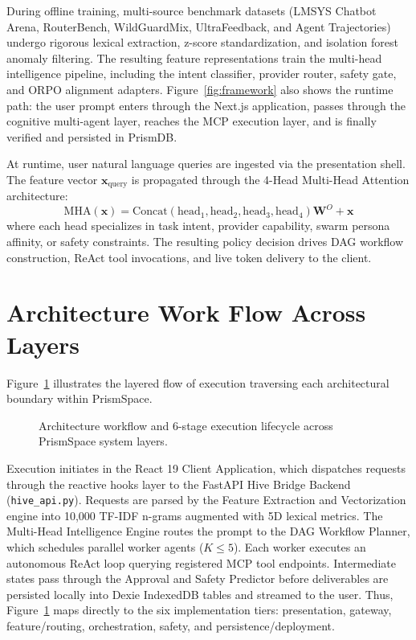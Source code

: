 \documentclass[12pt,a4paper]{report}
\begin{document}
During offline training, multi-source benchmark datasets (LMSYS Chatbot Arena, RouterBench, WildGuardMix, UltraFeedback, and Agent Trajectories) undergo rigorous lexical extraction, z-score standardization, and isolation forest anomaly filtering. The resulting feature representations train the multi-head intelligence pipeline, including the intent classifier, provider router, safety gate, and ORPO alignment adapters. Figure~\ref{fig:framework} also shows the runtime path: the user prompt enters through the Next.js application, passes through the cognitive multi-agent layer, reaches the MCP execution layer, and is finally verified and persisted in PrismDB.

At runtime, user natural language queries are ingested via the presentation shell. The feature vector $\mathbf{x}_{\text{query}}$ is propagated through the 4-Head Multi-Head Attention architecture:
\begin{equation}
    \mathrm{MHA}(\mathbf{x}) = \mathrm{Concat}(\mathrm{head}_1, \mathrm{head}_2, \mathrm{head}_3, \mathrm{head}_4)\mathbf{W}^O + \mathbf{x}
\end{equation}
where each head specializes in task intent, provider capability, swarm persona affinity, or safety constraints. The resulting policy decision drives DAG workflow construction, ReAct tool invocations, and live token delivery to the client.

\section{Architecture Work Flow Across Layers}
Figure~\ref{fig:arch_workflow} illustrates the layered flow of execution traversing each architectural boundary within PrismSpace.

\begin{figure}[H]
    \centering
    \caption{Architecture workflow and 6-stage execution lifecycle across PrismSpace system layers.}
    \label{fig:arch_workflow}
\end{figure}

Execution initiates in the React 19 Client Application, which dispatches requests through the reactive hooks layer to the FastAPI Hive Bridge Backend (\texttt{hive\_api.py}). Requests are parsed by the Feature Extraction and Vectorization engine into 10,000 TF-IDF n-grams augmented with 5D lexical metrics. The Multi-Head Intelligence Engine routes the prompt to the DAG Workflow Planner, which schedules parallel worker agents ($K \le 5$). Each worker executes an autonomous ReAct loop querying registered MCP tool endpoints. Intermediate states pass through the Approval and Safety Predictor before deliverables are persisted locally into Dexie IndexedDB tables and streamed to the user. Thus, Figure~\ref{fig:arch_workflow} maps directly to the six implementation tiers: presentation, gateway, feature/routing, orchestration, safety, and persistence/deployment.
\end{document}
